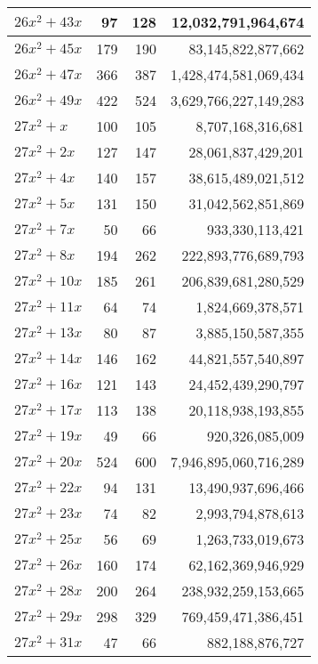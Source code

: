 \documentclass[a4paper]{amsproc}
\theoremstyle{plain}
\theoremstyle{named}
\begin{document}
\begin{longtable}{ | l | r | r | r | }
$26x^2 + 43x$ & 97 & 128 & 12{,}032{,}791{,}964{,}674 \\ \hline
$26x^2 + 45x$ & 179 & 190 & 83{,}145{,}822{,}877{,}662 \\ \hline
$26x^2 + 47x$ & 366 & 387 & 1{,}428{,}474{,}581{,}069{,}434 \\ \hline
$26x^2 + 49x$ & 422 & 524 & 3{,}629{,}766{,}227{,}149{,}283 \\ \hline
$27x^2 + x$ & 100 & 105 & 8{,}707{,}168{,}316{,}681 \\ \hline
$27x^2 + 2x$ & 127 & 147 & 28{,}061{,}837{,}429{,}201 \\ \hline
$27x^2 + 4x$ & 140 & 157 & 38{,}615{,}489{,}021{,}512 \\ \hline
$27x^2 + 5x$ & 131 & 150 & 31{,}042{,}562{,}851{,}869 \\ \hline
$27x^2 + 7x$ & 50 & 66 & 933{,}330{,}113{,}421 \\ \hline
$27x^2 + 8x$ & 194 & 262 & 222{,}893{,}776{,}689{,}793 \\ \hline
$27x^2 + 10x$ & 185 & 261 & 206{,}839{,}681{,}280{,}529 \\ \hline
$27x^2 + 11x$ & 64 & 74 & 1{,}824{,}669{,}378{,}571 \\ \hline
$27x^2 + 13x$ & 80 & 87 & 3{,}885{,}150{,}587{,}355 \\ \hline
$27x^2 + 14x$ & 146 & 162 & 44{,}821{,}557{,}540{,}897 \\ \hline
$27x^2 + 16x$ & 121 & 143 & 24{,}452{,}439{,}290{,}797 \\ \hline
$27x^2 + 17x$ & 113 & 138 & 20{,}118{,}938{,}193{,}855 \\ \hline
$27x^2 + 19x$ & 49 & 66 & 920{,}326{,}085{,}009 \\ \hline
$27x^2 + 20x$ & 524 & 600 & 7{,}946{,}895{,}060{,}716{,}289 \\ \hline
$27x^2 + 22x$ & 94 & 131 & 13{,}490{,}937{,}696{,}466 \\ \hline
$27x^2 + 23x$ & 74 & 82 & 2{,}993{,}794{,}878{,}613 \\ \hline
$27x^2 + 25x$ & 56 & 69 & 1{,}263{,}733{,}019{,}673 \\ \hline
$27x^2 + 26x$ & 160 & 174 & 62{,}162{,}369{,}946{,}929 \\ \hline
$27x^2 + 28x$ & 200 & 264 & 238{,}932{,}259{,}153{,}665 \\ \hline
$27x^2 + 29x$ & 298 & 329 & 769{,}459{,}471{,}386{,}451 \\ \hline
$27x^2 + 31x$ & 47 & 66 & 882{,}188{,}876{,}727 \\ \hline

\end{longtable}
\end{document}
